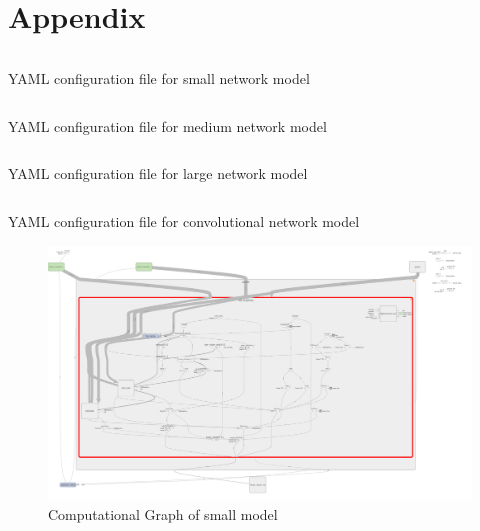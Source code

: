\documentclass[pageno]{jpaper}
\begin{document}
\section{Appendix}
\begin{singlespace}
\begin{listing}
\inputminted[]{YAML}{../config/small_config.yaml}
\caption{YAML configuration file for small network model}
\end{listing}
\pagebreak

\begin{listing}
\inputminted[]{YAML}{../config/medium_config.yaml}
\caption{YAML configuration file for medium network model}
\end{listing}
\pagebreak

\begin{listing}
\inputminted[]{YAML}{../config/large_config.yaml}
\caption{YAML configuration file for large network model}
\end{listing}
\pagebreak

\begin{listing}
	\inputminted[]{YAML}{../config/conv_config.yaml}
	\caption{YAML configuration file for convolutional network model}
\end{listing}
\pagebreak
\end{singlespace}

\pagebreak
\begin{figure}[H]
	\centering
	\includegraphics[scale=0.13, angle=90]{small_model_full_graph.png}
	\caption{Computational Graph of small model}
	\label{fg:small_model_graph}
\end{figure}
\end{document}
